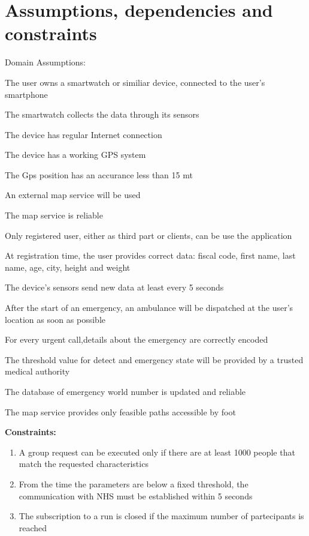 \section{Assumptions, dependencies and constraints}
Domain Assumptions:
\begin{enumerate}[label={[}D.\arabic*{]}]

\item \label{d:1}
The user owns a smartwatch or similiar device, connected to the user’s smartphone
\item\label{d:2}
The smartwatch collects the data through its sensors
\item\label{d:3}
The device has regular Internet connection 
\item\label{d:4}
The device has a working GPS system 
\item\label{d:4}
The Gps position has an accurance less than 15 mt
\item\label{d:5}
An external map service will be used
\item\label{d:6}
The map service is reliable
\item\label{d:7}
Only registered user, either as third part or clients, can be use the application
\item\label{d:8}
At registration time, the user provides correct data: fiscal code, first name, last name, age, city, height and weight
\item\label{d:9}
The device’s sensors send new data at least every 5 seconds
\item\label{d:10}
After the start of an emergency, an ambulance will be dispatched at the user’s location as soon as possible
\item\label{d:11}
For every urgent call,details about the emergency are correctly encoded
\item\label{d:12}
The threshold value for detect and emergency state will be provided by a trusted medical authority
\item\label{d:13}
The database of emergency world number is updated and reliable
\item\label{d:14}
The map service provides only feasible paths accessible by foot
\end{enumerate}

\textbf{Constraints:}

\begin{enumerate}
    \item\label{c:1}	A group request can be executed only if there are at least 1000 people that match the requested characteristics 
    \item\label{c:2}
    From the time the parameters are below a fixed threshold, the communication with NHS must be established within 5 seconds
    \item\label{c:3}
    The subscription to a run is closed if the maximum number of partecipants is reached
\end{enumerate}


